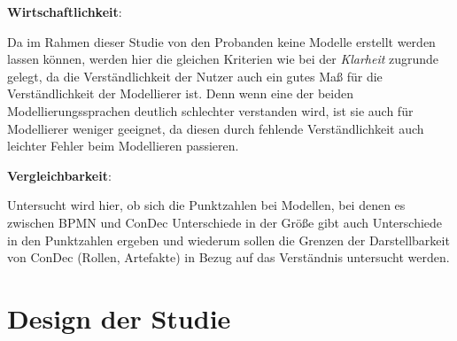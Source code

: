 \textbf{Wirtschaftlichkeit}: 

Da im Rahmen dieser Studie von den Probanden keine Modelle erstellt werden lassen können, werden hier die gleichen Kriterien wie bei der \textit{Klarheit} zugrunde gelegt, da die Verständlichkeit der Nutzer auch ein gutes Maß für die Verständlichkeit der Modellierer ist. Denn wenn eine der beiden Modellierungssprachen deutlich schlechter verstanden wird, ist sie auch für Modellierer weniger geeignet, da diesen durch fehlende Verständlichkeit auch leichter Fehler beim Modellieren passieren.\newline

\textbf{Vergleichbarkeit}: 

Untersucht wird hier, ob sich die Punktzahlen bei Modellen, bei denen es zwischen BPMN und ConDec Unterschiede in der Größe gibt auch Unterschiede in den Punktzahlen ergeben und wiederum sollen die Grenzen der Darstellbarkeit von ConDec (Rollen, Artefakte) in Bezug auf das Verständnis untersucht werden.\newline


\section{Design der Studie}


